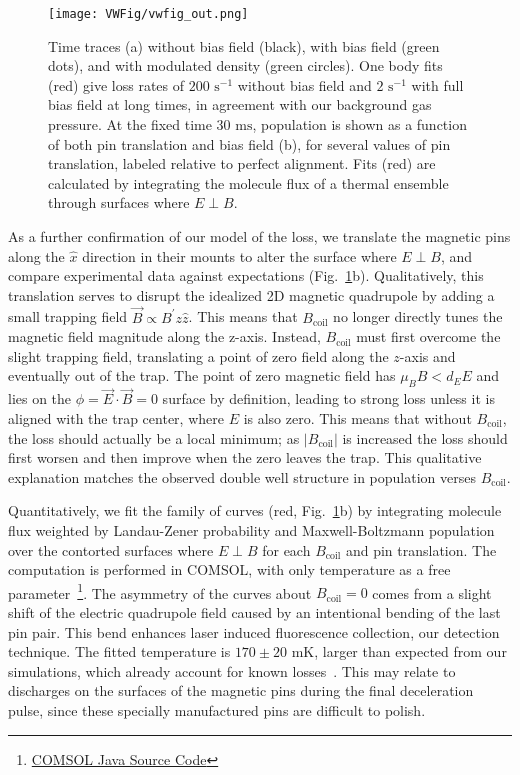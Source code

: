 \documentclass[%
 reprint,
 amsmath,amssymb,
 aps,
prl,
]{revtex4-1}
\newcommand{\bcl}{{$B_\text{coil}$}}
\newcommand{\epb}{{$E\!\perp\!B$}}
\newcommand{\cmnt}[1]{\ignorespaces}
\begin{document}
\begin{figure}[tb]
\texttt{[image: VWFig/vwfig\_out.png]}%
\caption{
Time traces (a) without bias field (black), with bias field (green dots), and with modulated density (green circles). One body fits (red) give loss rates of $200\text{ s}^{-1}$ without bias field and $2\text{ s}^{-1}$ with full bias field at long times, in agreement with our background gas pressure. At the fixed time $30\text{ ms}$, population is shown as a function of both pin translation and bias field (b), for several values of pin translation, labeled relative to perfect alignment. Fits (red) are calculated by integrating the molecule flux of a thermal ensemble through surfaces where \epb.
\label{fig:WVplot}}
\end{figure}


As a further confirmation of our \cmnt{\epb{}  and $\mu_BB<d_EE$} model of the loss, we translate the magnetic pins along the $\hat{x}$ direction in their mounts to alter the surface where \epb{}, and compare experimental data against expectations (Fig.~\ref{fig:WVplot}b). Qualitatively, this translation serves to disrupt the idealized 2D magnetic quadrupole by adding a small trapping field $\vec{B}\propto B^\prime z\hat{z}$. This means that \bcl{} no longer directly tunes the magnetic field magnitude along the z-axis. Instead, \bcl{} must first overcome the slight trapping field, translating a point of zero field along the $z$-axis and eventually out of the trap. The point of zero magnetic field has $\mu_BB<d_EE$ and lies on the $\phi=\vec{E}\cdot\vec{B}=0$ surface by definition, leading to strong loss unless it is aligned with the trap center, where $E$ is also zero. This means that without \bcl{}, the loss should actually be a local minimum; as $|B_\text{coil}|$ is increased the loss should first worsen and then improve when the zero leaves the trap. This qualitative explanation matches the observed double well structure in population verses \bcl.

Quantitatively, we fit the family of curves (red, Fig.~\ref{fig:WVplot}b) by integrating molecule flux weighted by Landau-Zener probability and Maxwell-Boltzmann population over the contorted surfaces where \epb{} for each \bcl{} and pin translation. The computation is performed in COMSOL, with only temperature as a free parameter~\footnote{\href{https://github.com/dreens/spin-flip-integration/}{COMSOL Java Source Code}}. The asymmetry of the curves about $B_\text{coil}=0$ comes from a slight shift of the electric quadrupole field caused by an intentional bending of the last pin pair. This bend enhances laser induced fluorescence collection, our detection technique. The fitted temperature is $170\pm20\text{ mK}$, larger than expected from our simulations, which already account for known losses~\cite{Sawyer2008a}. This may relate to discharges on the surfaces of the magnetic pins during the final deceleration pulse, since these specially manufactured pins are difficult to polish.
\end{document}
